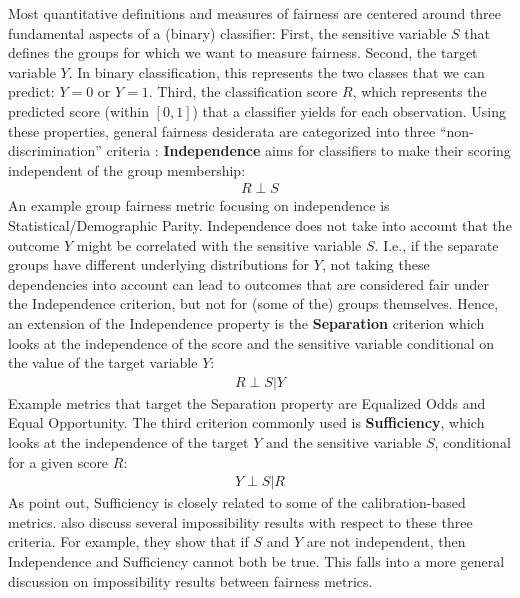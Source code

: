 \label{subsec:abstractfairnesscriteria}
Most quantitative definitions and measures of fairness are centered around three fundamental aspects of a (binary) classifier: First, the sensitive variable $S$ that defines the groups for which we want to measure fairness. Second, the target variable $Y$. In binary classification, this represents the two classes that we can predict: $Y=0$ or $Y=1$. Third, the classification score $R$, which represents the predicted score (within $[0,1]$) that a classifier yields for each observation. Using these properties, general fairness desiderata are categorized into three ``non-discrimination'' criteria :
\textbf{Independence} aims for classifiers to make their scoring independent of the group membership:
\begin{align}
    R \perp S
\end{align}
An example group fairness metric focusing on independence is Statistical/Demographic Parity. Independence does not take into account that the outcome $Y$ might be correlated with the sensitive variable $S$. I.e., if the separate groups have different underlying distributions for $Y$, not taking these dependencies into account can lead to outcomes that are considered fair under the Independence criterion, but not for (some of the) groups themselves. Hence, an extension of the Independence property is the \textbf{Separation} criterion which looks at the independence of the score and the sensitive variable conditional on the value of the target variable $Y$:
\begin{align}
    R \perp S | Y
\end{align}
Example metrics that target the Separation property are Equalized Odds and Equal Opportunity. The third criterion commonly used is \textbf{Sufficiency}, which looks at the independence of the target $Y$ and the sensitive variable $S$, conditional for a given score $R$:
\begin{align}
    Y \perp S | R
\end{align}
As  point out, Sufficiency is closely related to some of the calibration-based metrics. 
 also discuss several impossibility results with respect to these three criteria. For example, they show that if $S$ and $Y$ are not independent, then Independence and Sufficiency cannot both be true. This falls into a more general discussion on impossibility results between fairness metrics.

